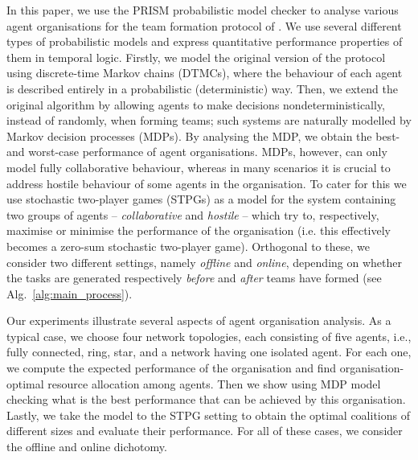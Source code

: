 \documentclass{llncs}
\begin{document}
In this paper, we use the PRISM probabilistic model checker \cite{KNP11} to analyse various agent organisations for the team formation protocol of \cite{gaston2005agent}.
We use several different types of probabilistic models
and express quantitative performance properties of them in temporal logic.
Firstly, we model the original version of the protocol using discrete-time Markov chains (DTMCs), where the behaviour of each agent is described entirely in a probabilistic (deterministic) way. Then, we extend the original algorithm  by allowing agents to make decisions nondeterministically, instead of randomly, when forming teams; such systems are naturally modelled by Markov decision processes (MDPs). By analysing the MDP, we obtain the best- and worst-case performance of agent organisations.
MDPs, however, can only model fully collaborative behaviour,
whereas in many scenarios it is crucial to address hostile behaviour of some agents in the organisation. To cater for this we use stochastic two-player games (STPGs) as a model for the system containing two groups of agents -- \emph{collaborative} and \emph{hostile} -- which try to, respectively, maximise
 or minimise the performance of the organisation (i.e. this effectively becomes a zero-sum stochastic two-player game). Orthogonal to these, we consider two different settings, namely \emph{offline} and \emph{online}, depending on whether the tasks are generated respectively \emph{before} and \emph{after} teams have formed (see Alg.~\ref{alg:main_process}).


Our experiments illustrate several aspects of agent organisation analysis. As a typical case, we choose four network topologies, each consisting of five agents, i.e., fully connected, ring, star, and a network having one isolated agent. For each one, we compute the expected performance of the organisation and find organisation-optimal resource allocation among agents. Then we show using MDP model checking what is the best performance that can be achieved by this organisation. Lastly, we take the model to the STPG setting to obtain the optimal coalitions of different sizes and evaluate their performance. For all of these cases, we consider the offline and online dichotomy.
\end{document}
